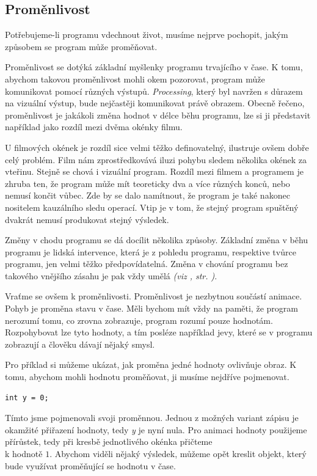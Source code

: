 \documentclass[10pt,twoside=true,open=right,cleardoublepage=empty,chapterprefix=true]{scrbook}
\newcommand{\pododdil}[1]{\subsection{#1}\index{#1}\label{#1}}
\newcommand{\odkaz}[1]{\textit{(viz \nameref{#1}, str. \pageref*{#1})}}
\begin{document}
\pododdil{Proměnlivost}


Potřebujeme-li programu vdechnout život, musíme nejprve pochopit, jakým způsobem se program může proměňovat.

Proměnlivost se dotýká základní myšlenky programu trvajícího v čase. K tomu, abychom takovou proměnlivost mohli okem pozorovat, program může komunikovat pomocí různých výstupů. {\em Processing}, který byl navržen s důrazem na vizuální výstup, bude nejčastěji komunikovat právě obrazem. Obecně řečeno, proměnlivost je jakákoli změna hodnot v délce běhu programu, lze si ji představit například jako rozdíl mezi dvěma okénky filmu.

U filmových okének je rozdíl sice velmi těžko definovatelný, ilustruje ovšem dobře celý problém. Film nám zprostředkovává iluzi pohybu sledem několika okének za vteřinu. Stejně se chová i vizuální program. Rozdíl mezi filmem a programem je zhruba ten, že program může mít teoreticky dva a více různých konců, nebo nemusí končit vůbec. Zde by se dalo namítnout, že program je také nakonec nositelem kauzálního sledu operací. Vtip je v tom, že stejný program spuštěný dvakrát nemusí produkovat stejný výsledek.

Změny v chodu programu se dá docílit několika způsoby. Základní změna v běhu programu je lidská intervence, která je z pohledu programu, respektive tvůrce programu, jen velmi těžko předpovídatelná. Změna v chování programu bez takového vnějšího zásahu je pak vždy umělá \odkaz{Náhoda}.


Vraťme se ovšem k proměnlivosti. Proměnlivost je nezbytnou součástí animace. Pohyb je proměna stavu v čase. Měli bychom mít vždy na paměti, že program nerozumí tomu, co zrovna zobrazuje, program rozumí pouze hodnotám. Rozpohybovat lze tyto hodnoty, a tím posléze například jevy, které se v programu zobrazují a člověku dávají nějaký smysl. 

Pro příklad si můžeme ukázat, jak proměna jedné hodnoty ovlivňuje obraz. K tomu, abychom mohli hodnotu proměňovat, ji musíme nejdříve pojmenovat.

\begin{lstlisting}
int y = 0;
\end{lstlisting}

Tímto jsme pojmenovali svoji proměnnou. Jednou z možných variant zápisu je okamžité přiřazení hodnoty, tedy {\em y} je nyní nula. Pro animaci hodnoty použijeme přírůstek, tedy při kresbě jednotlivého okénka přičteme \\k hodnotě $1$. Abychom viděli nějaký výsledek, můžeme opět kreslit objekt, který bude využívat proměňující se hodnotu v čase.
\end{document}
